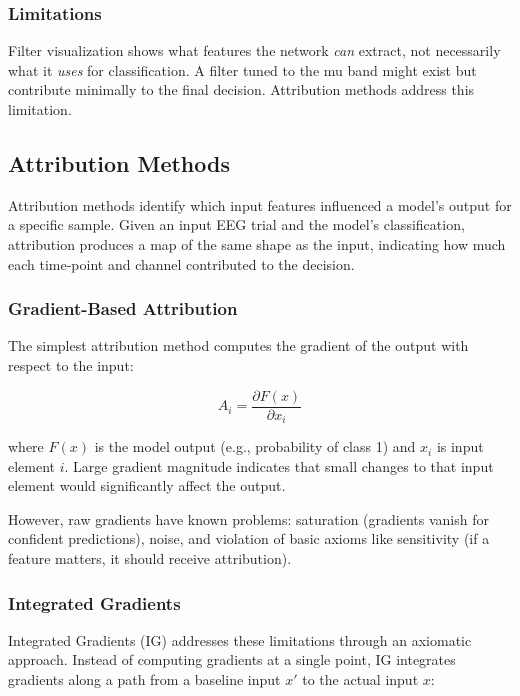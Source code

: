 \subsubsection{Limitations}

Filter visualization shows what features the network \textit{can} extract, not necessarily what it \textit{uses} for classification. A filter tuned to the mu band might exist but contribute minimally to the final decision. Attribution methods address this limitation.


\subsection{Attribution Methods}
\label{subsec:bg_attribution}

Attribution methods identify which input features influenced a model's output for a specific sample. Given an input EEG trial and the model's classification, attribution produces a map of the same shape as the input, indicating how much each time-point and channel contributed to the decision.

\subsubsection{Gradient-Based Attribution}

The simplest attribution method computes the gradient of the output with respect to the input:

\begin{equation}
    A_i = \frac{\partial F(x)}{\partial x_i}
    \label{eq:gradient}
\end{equation}

where $F(x)$ is the model output (e.g., probability of class 1) and $x_i$ is input element $i$. Large gradient magnitude indicates that small changes to that input element would significantly affect the output.

However, raw gradients have known problems: saturation (gradients vanish for confident predictions), noise, and violation of basic axioms like sensitivity (if a feature matters, it should receive attribution).

\subsubsection{Integrated Gradients}

Integrated Gradients (IG) \cite{sundararajan2017axiomatic} addresses these limitations through an axiomatic approach. Instead of computing gradients at a single point, IG integrates gradients along a path from a baseline input $x'$ to the actual input $x$:

